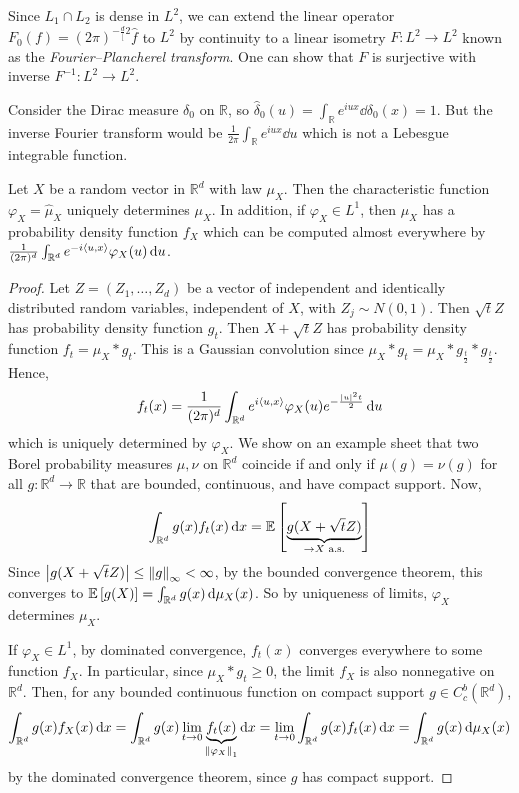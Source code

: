 \begin{remark}
	Since \( L_1 \cap L_2 \) is dense in \( L^2 \), we can extend the linear operator \( F_0(f) = (2\pi)^{-\frac{d}[2} \hat f \) to \( L^2 \) by continuity to a linear isometry \( F \colon L^2 \to L^2 \) known as the \emph{Fourier--Plancherel transform}.
	One can show that \( F \) is surjective with inverse \( F^{-1} \colon L^2 \to L^2 \).
\end{remark}
\begin{example}
	Consider the Dirac measure \( \delta_0 \) on \( \mathbb R \), so \( \hat \delta_0(u) = \int_{\mathbb R} e^{iux} \dd{\delta_0(x)} = 1 \).
	But the inverse Fourier transform would be \( \frac{1}{2\pi} \int_{\mathbb R} e^{iux} \dd{u} \) which is not a Lebesgue integrable function.
\end{example}
\begin{theorem}
	Let \( X \) be a random vector in \( \mathbb R^d \) with law \( \mu_X \).
	Then the characteristic function \( \varphi_X = \hat \mu_X \) uniquely determines \( \mu_X \).
	In addition, if \( \varphi_X \in L^1 \), then \( \mu_X \) has a probability density function \( f_X \) which can be computed almost everywhere by \( \frac{1}{(2\pi)^d} \int_{\mathbb R^d} e^{-i\left\langle{u,x}\right\rangle} \varphi_X(u) \dd{u} \).
\end{theorem}
\begin{proof}
	Let \( Z = (Z_1, \dots, Z_d) \) be a vector of independent and identically distributed random variables, independent of \( X \), with \( Z_j \sim N(0,1) \).
	Then \( \sqrt{t} Z \) has probability density function \( g_t \).
	Then \( X + \sqrt{t} Z \) has probability density function \( f_t = \mu_X \ast g_t \).
	This is a Gaussian convolution since \( \mu_X \ast g_t = \mu_X \ast g_{\frac t 2} \ast g_{\frac t 2} \).
	Hence,
	\[ f_t(x) = \frac{1}{(2\pi)^d} \int_{\mathbb R^d} e^{i\left\langle{u,x}\right\rangle} \varphi_X(u) e^{-\frac{\abs{u}^2 t}{2}} \dd{u} \]
	which is uniquely determined by \( \varphi_X \).
	We show on an example sheet that two Borel probability measures \( \mu, \nu \) on \( \mathbb R^d \) coincide if and only if \( \mu(g) = \nu(g) \) for all \( g \colon \mathbb R^d \to \mathbb R \) that are bounded, continuous, and have compact support.
	Now,
	\[ \int_{\mathbb R^d} g(x) f_t(x) \dd{x} = \mathbb{E}\left[{\underbrace{g(X + \sqrt{t} Z)}_{\to X \text{ a.s.}}}\right] \]
	Since \( \abs{g(X + \sqrt{t}Z)} \leq \norm{g}_\infty < \infty \), by the bounded convergence theorem, this converges to \( \mathbb{E}\left[{g(X)}\right] = \int_{\mathbb R^d} g(x) \dd{\mu_X(x)} \).
	So by uniqueness of limits, \( \varphi_X \) determines \( \mu_X \).

	If \( \varphi_X \in L^1 \), by dominated convergence, \( f_t(x) \) converges everywhere to some function \( f_X \).
	In particular, since \( \mu_X \ast g_t \geq 0 \), the limit \( f_X \) is also nonnegative on \( \mathbb R^d \).
	Then, for any bounded continuous function on compact support \( g \in C^b_c(\mathbb R^d) \),
	\[ \int_{\mathbb R^d} g(x) f_X(x) \dd{x} = \int_{\mathbb R^d} g(x) \lim_{t \to 0} \underbrace{f_t(x)}_{\norm{\varphi_X}_1} \dd{x} = \lim_{t \to 0} \int_{\mathbb R^d} g(x) f_t(x) \dd{x} = \int_{\mathbb R^d} g(x) \dd{\mu_X(x)} \]
	by the dominated convergence theorem, since \( g \) has compact support.
\end{proof}
